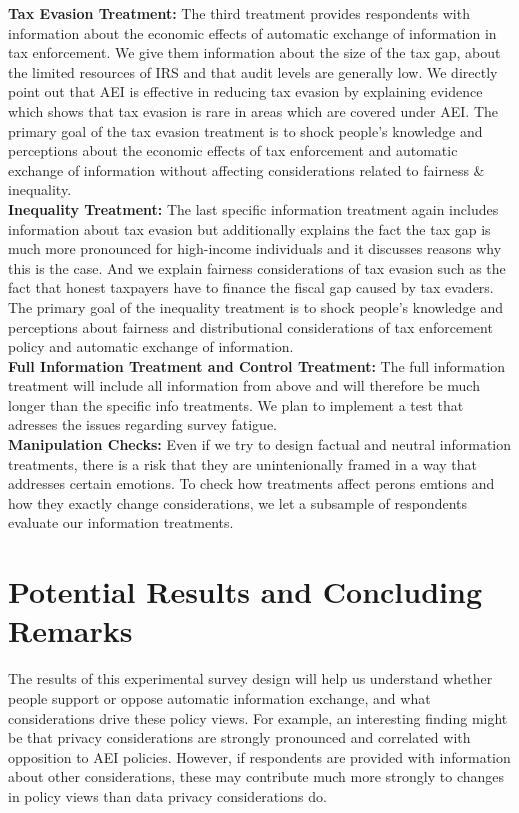 \documentclass[11pt]{article}
\begin{document}
\textbf{Tax Evasion Treatment:}
The third treatment provides respondents with information about the economic effects of automatic exchange of information in tax enforcement. We give them information about the size of the tax gap, about the limited resources of IRS and that audit levels are generally low. We directly point out that AEI is effective in reducing tax evasion by explaining evidence which shows that tax evasion is rare in areas which are covered under AEI. The primary goal of the tax evasion treatment is to shock people’s knowledge and perceptions about the economic effects of tax enforcement and automatic exchange of information without affecting considerations related to fairness \& inequality. \\[0.5em]%
\textbf{Inequality Treatment:}
The last specific information treatment again includes information about tax evasion but additionally explains the fact the tax gap is much more pronounced for high-income individuals and it discusses reasons why this is the case. And we explain fairness considerations of tax evasion such as the fact that honest taxpayers have to finance the fiscal gap caused by tax evaders. The primary goal of the inequality treatment is to shock people’s knowledge and perceptions about fairness and distributional considerations of tax enforcement policy and automatic exchange of information. \\[0.5em]
\textbf{Full Information Treatment and Control Treatment:} The full information treatment will include all information from above and will therefore be much longer than the specific info treatments. We plan to implement a test that adresses the issues regarding survey fatigue.  \\[0.5em]
\textbf{Manipulation Checks:} Even if we try to design factual and neutral information treatments, there is a risk that they are unintenionally framed in a way that addresses certain emotions. To check how treatments affect perons emtions and how they exactly change considerations, we let a subsample of respondents evaluate our information treatments. 

\section{Potential Results and Concluding Remarks}
The results of this experimental survey design will help us understand whether people support or oppose automatic information exchange, and what considerations drive these policy views. For example, an interesting finding might be that privacy considerations are strongly pronounced and correlated with opposition to AEI policies. However, if respondents are provided with information about other considerations, these may contribute much more strongly to changes in policy views than data privacy considerations do. 
\end{document}

